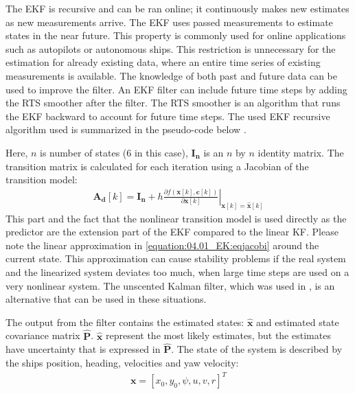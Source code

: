 The EKF is recursive and can be ran online; it continuously makes new estimates as new measurements arrive. The EKF uses passed measurements to estimate states in the near future. This property is commonly used for online applications such as autopilots or autonomous ships. This restriction is unnecessary for the estimation for already existing data, where an entire time series of existing measurements is available. The knowledge of both past and future data can be used to improve the filter. An EKF filter can include future time steps by adding the RTS smoother after the filter. The RTS smoother is an algorithm that runs the EKF backward to account for future time steps. The used EKF recursive algorithm used is summarized in the pseudo-code below \cite{brownIntroductionRandomSignals1997}.

Here, \(n\) is number of states (6 in this case), \(\mathbf{I_n}\) is an $n$ by $n$ identity matrix.
The transition matrix is calculated for each iteration using a Jacobian of the transition model:
\begin{equation}\label{equation:04.01_EK:eqjacobi}
\begin{split}\mathbf{A_d}[k] = \mathbf{I_n} + h \left. \frac{\partial f \left(\mathbf{x}[k],\mathbf{c}[k] \right)}{\partial \mathbf{x}[k]} \right|_{\mathbf{x}[k]=\mathbf{\hat{x}}[k]}\end{split}
\end{equation}
This part and the fact that the nonlinear transition model is used directly as the predictor are the extension part of the EKF compared to the linear KF. Please note the linear approximation in \autoref{equation:04.01_EK:eqjacobi} around the current state. This approximation can cause stability problems if the real system and the linearized system deviates too much, when large time steps are used on a very nonlinear system. The unscented Kalman filter, which was used in \textcite{revestidoherreroTwostepIdentificationNonlinear2012}, is an alternative that can be used in these situations.

The output from the filter contains the estimated states: \(\mathbf{\hat{x}}\) and estimated state covariance matrix \(\mathbf{\hat{P}}\). \(\mathbf{\hat{x}}\) represent the most likely estimates, but the estimates have uncertainty that is expressed in \(\mathbf{\hat{P}}\).
The state of the system is described by the ships position, heading, velocities and yaw velocity:
\begin{equation}\label{equation:04.01_EK:eqstates}
\begin{split}\mathbf{x} = [x_0,y_0,\psi,u,v,r]^T\end{split}
\end{equation}

